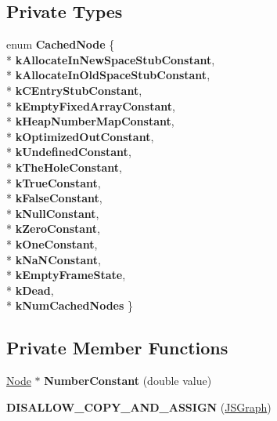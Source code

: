 \subsection*{Private Types}
\begin{DoxyCompactItemize}
\item 
enum {\bfseries Cached\+Node} \{ \\*
{\bfseries k\+Allocate\+In\+New\+Space\+Stub\+Constant}, 
\\*
{\bfseries k\+Allocate\+In\+Old\+Space\+Stub\+Constant}, 
\\*
{\bfseries k\+C\+Entry\+Stub\+Constant}, 
\\*
{\bfseries k\+Empty\+Fixed\+Array\+Constant}, 
\\*
{\bfseries k\+Heap\+Number\+Map\+Constant}, 
\\*
{\bfseries k\+Optimized\+Out\+Constant}, 
\\*
{\bfseries k\+Undefined\+Constant}, 
\\*
{\bfseries k\+The\+Hole\+Constant}, 
\\*
{\bfseries k\+True\+Constant}, 
\\*
{\bfseries k\+False\+Constant}, 
\\*
{\bfseries k\+Null\+Constant}, 
\\*
{\bfseries k\+Zero\+Constant}, 
\\*
{\bfseries k\+One\+Constant}, 
\\*
{\bfseries k\+Na\+N\+Constant}, 
\\*
{\bfseries k\+Empty\+Frame\+State}, 
\\*
{\bfseries k\+Dead}, 
\\*
{\bfseries k\+Num\+Cached\+Nodes}
 \}\hypertarget{classv8_1_1internal_1_1compiler_1_1_j_s_graph_ab50aa64d3fb70036cbb4624dd2df1f67}{}\label{classv8_1_1internal_1_1compiler_1_1_j_s_graph_ab50aa64d3fb70036cbb4624dd2df1f67}

\end{DoxyCompactItemize}
\subsection*{Private Member Functions}
\begin{DoxyCompactItemize}
\item 
\hyperlink{classv8_1_1internal_1_1compiler_1_1_node}{Node} $\ast$ {\bfseries Number\+Constant} (double value)\hypertarget{classv8_1_1internal_1_1compiler_1_1_j_s_graph_a502e060a31f458df910afcc4cc4b6575}{}\label{classv8_1_1internal_1_1compiler_1_1_j_s_graph_a502e060a31f458df910afcc4cc4b6575}

\item 
{\bfseries D\+I\+S\+A\+L\+L\+O\+W\+\_\+\+C\+O\+P\+Y\+\_\+\+A\+N\+D\+\_\+\+A\+S\+S\+I\+GN} (\hyperlink{classv8_1_1internal_1_1compiler_1_1_j_s_graph}{J\+S\+Graph})\hypertarget{classv8_1_1internal_1_1compiler_1_1_j_s_graph_a1858209e19bd8341632191aee2f6a411}{}\label{classv8_1_1internal_1_1compiler_1_1_j_s_graph_a1858209e19bd8341632191aee2f6a411}

\end{DoxyCompactItemize}

